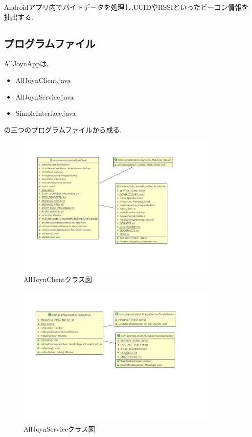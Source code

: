 Androidアプリ内でバイトデータを処理し,UUIDやRSSIといったビーコン情報を抽出する.


\subsection{プログラムファイル}
AllJoynAppは,
\begin{itemize}
\item AllJoynClient.java
\item AllJoynService.java
\item SimpleInterface.java
\end{itemize}
の三つのプログラムファイルから成る.


\begin{figure}[htbp]
\begin{center}
\includegraphics[width=10cm]{fig/class_client.pdf}
\end{center}
\caption{AllJoynClientクラス図}
\end{figure}

\begin{figure}
\begin{center}
\includegraphics[width=10cm]{fig/class_service.pdf}
\end{center}
\caption{AllJoynServiceクラス図}
\end{figure}

